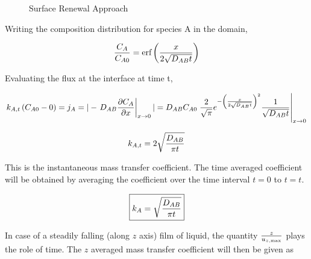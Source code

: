 \begin{figure}[h]
\begin{center}
\end{center}
\caption{Surface Renewal Approach}
\label{surfrenew}
\end{figure}

Writing the composition distribution for species A in the domain,

$$ { C_A \over C_{A0} } = \text{erf} \left({x \over 2\sqrt{D_{AB}t}}\right)$$

Evaluating the flux at the interface at time t,

$$ k_{A,t} \left( C_{A0} - 0 \right) = j_A = | - \left. D_{AB} {\partial C_A
\over \partial x} \right|_{x \rightarrow 0} | = D_{AB} C_{A0} \left. {2 \over
\sqrt{\pi}} e^{-\left({x \over 2\sqrt{D_{AB}t}}\right)^2} {1 \over \sqrt{D_{AB}
t}} \right|_{x \rightarrow 0}$$

$$ k_{A,t} = 2 \sqrt{D_{AB} \over \pi t} $$

This is the instantaneous mass transfer coefficient. The time averaged
coefficient will be obtained by averaging the coefficient over the time interval
$t=0$ to $t=t$.

$$ \boxed{
k_A = \sqrt{D_{AB} \over \pi t} 
}$$

In case of a steadily falling (along $z$ axis) film of liquid, the quantity $z
\over u_{z,\text{max}}$ plays the role of time. The $z$ averaged mass transfer
coefficient will then be given as

